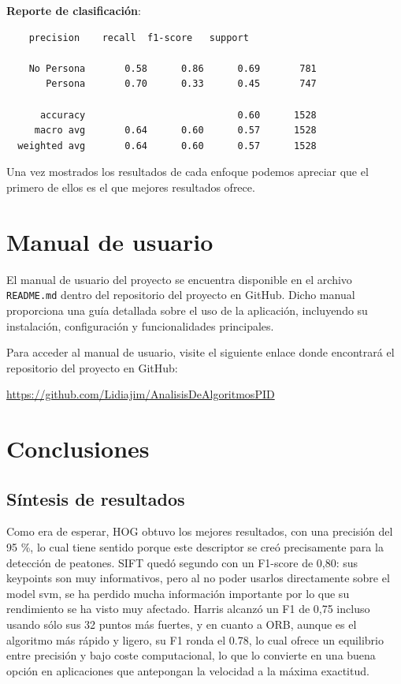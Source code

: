 \documentclass[a4paper]{article}
\begin{document}
\textbf{Reporte de clasificación}:

\begin{verbatim}
    precision    recall  f1-score   support

    No Persona       0.58      0.86      0.69       781
       Persona       0.70      0.33      0.45       747
  
      accuracy                           0.60      1528
     macro avg       0.64      0.60      0.57      1528
  weighted avg       0.64      0.60      0.57      1528
\end{verbatim}

Una vez mostrados los resultados de cada enfoque podemos apreciar que el primero de ellos es el que mejores resultados ofrece.


\newpage

\section{Manual de usuario}

El manual de usuario del proyecto se encuentra disponible en el archivo \texttt{README.md} dentro del repositorio del proyecto en GitHub. Dicho manual proporciona una guía detallada sobre el uso de la aplicación, incluyendo su instalación, configuración y funcionalidades principales.
\par\hspace{1cm}

Para acceder al manual de usuario, visite el siguiente enlace donde encontrará el repositorio del proyecto en GitHub:

\begin{center}
\url{https://github.com/Lidiajim/AnalisisDeAlgoritmosPID}
\end{center}
\newpage

\section{Conclusiones}

\subsection{Síntesis de resultados}

Como era de esperar, HOG obtuvo los mejores resultados, con una precisión del 95 \%, lo cual tiene sentido 
porque este descriptor se creó precisamente para la detección de peatones. 
SIFT quedó segundo con un F1-score de 0,80: sus keypoints son muy informativos, pero al no poder usarlos directamente sobre el model svm,
se ha perdido mucha información importante por lo que su rendimiento se ha visto muy afectado. Harris alcanzó un F1 de 0,75 incluso usando sólo sus 32 puntos más fuertes, 
y en cuanto a ORB, aunque es el algoritmo más rápido y ligero, su F1 ronda el 0.78, lo cual ofrece un equilibrio entre precisión y bajo coste computacional, lo que lo convierte en una buena opción en aplicaciones que antepongan la velocidad a la máxima exactitud.
\end{document}
